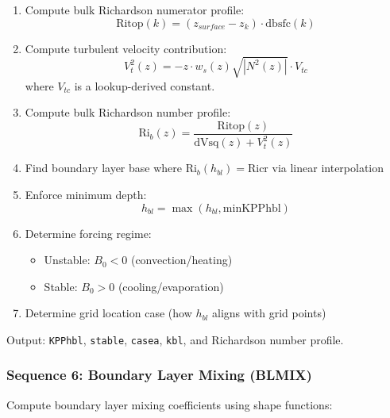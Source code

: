 \documentclass[11pt, a4paper]{article}
\begin{document}
\begin{enumerate}
    \item Compute bulk Richardson numerator profile:
    \begin{equation}
    \text{Ritop}(k) = (z_{surface} - z_k) \cdot \text{dbsfc}(k)
    \end{equation}
    
    \item Compute turbulent velocity contribution:
    \begin{equation}
    V_t^2(z) = -z \cdot w_s(z) \sqrt{|N^2(z)|} \cdot V_{tc}
    \end{equation}
    where $V_{tc}$ is a lookup-derived constant.
    
    \item Compute bulk Richardson number profile:
    \begin{equation}
    \text{Ri}_b(z) = \frac{\text{Ritop}(z)}{\text{dVsq}(z) + V_t^2(z)}
    \end{equation}
    
    \item Find boundary layer base where $\text{Ri}_b(h_{bl}) = \text{Ricr}$ via linear interpolation
    
    \item Enforce minimum depth:
    \begin{equation}
    h_{bl} = \max(h_{bl}, \text{minKPPhbl})
    \end{equation}
    
    \item Determine forcing regime:
    \begin{itemize}
        \item Unstable: $B_0 < 0$ (convection/heating)
        \item Stable: $B_0 > 0$ (cooling/evaporation)
    \end{itemize}
    
    \item Determine grid location case (how $h_{bl}$ aligns with grid points)
\end{enumerate}

Output: \texttt{KPPhbl}, \texttt{stable}, \texttt{casea}, \texttt{kbl}, and Richardson number profile.

\subsubsection{Sequence 6: Boundary Layer Mixing (BLMIX)}

Compute boundary layer mixing coefficients using shape functions:
\end{document}
